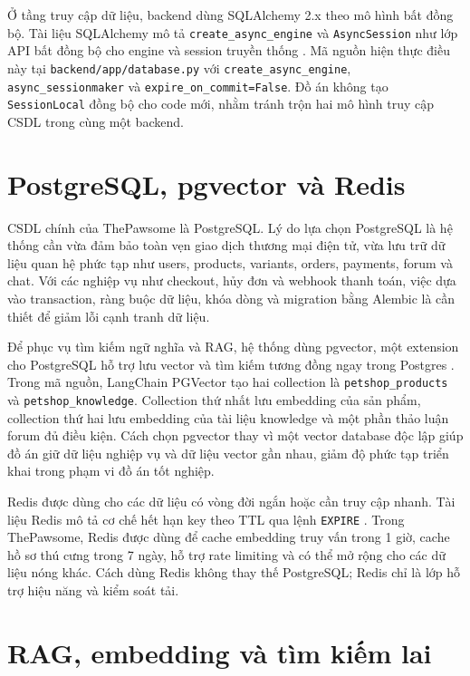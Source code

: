 \documentclass[../DoAn.tex]{subfiles}
\begin{document}
Ở tầng truy cập dữ liệu, backend dùng SQLAlchemy 2.x theo mô hình bất đồng bộ. Tài liệu SQLAlchemy mô tả \texttt{create\_async\_engine} và \texttt{AsyncSession} như lớp API bất đồng bộ cho engine và session truyền thống \cite{sqlalchemyAsyncioDocs}. Mã nguồn hiện thực điều này tại \texttt{backend/app/database.py} với \texttt{create\_async\_engine}, \texttt{async\_sessionmaker} và \texttt{expire\_on\_commit=False}. Đồ án không tạo \texttt{SessionLocal} đồng bộ cho code mới, nhằm tránh trộn hai mô hình truy cập CSDL trong cùng một backend.

\section{PostgreSQL, pgvector và Redis}
\label{section:3.2}

CSDL chính của ThePawsome là PostgreSQL. Lý do lựa chọn PostgreSQL là hệ thống cần vừa đảm bảo toàn vẹn giao dịch thương mại điện tử, vừa lưu trữ dữ liệu quan hệ phức tạp như users, products, variants, orders, payments, forum và chat. Với các nghiệp vụ như checkout, hủy đơn và webhook thanh toán, việc dựa vào transaction, ràng buộc dữ liệu, khóa dòng và migration bằng Alembic là cần thiết để giảm lỗi cạnh tranh dữ liệu.

Để phục vụ tìm kiếm ngữ nghĩa và RAG, hệ thống dùng pgvector, một extension cho PostgreSQL hỗ trợ lưu vector và tìm kiếm tương đồng ngay trong Postgres \cite{pgvectorDocs}. Trong mã nguồn, LangChain PGVector tạo hai collection là \texttt{petshop\_products} và \texttt{petshop\_knowledge}. Collection thứ nhất lưu embedding của sản phẩm, collection thứ hai lưu embedding của tài liệu knowledge và một phần thảo luận forum đủ điều kiện. Cách chọn pgvector thay vì một vector database độc lập giúp đồ án giữ dữ liệu nghiệp vụ và dữ liệu vector gần nhau, giảm độ phức tạp triển khai trong phạm vi đồ án tốt nghiệp.

Redis được dùng cho các dữ liệu có vòng đời ngắn hoặc cần truy cập nhanh. Tài liệu Redis mô tả cơ chế hết hạn key theo TTL qua lệnh \texttt{EXPIRE} \cite{redisExpireDocs}. Trong ThePawsome, Redis được dùng để cache embedding truy vấn trong 1 giờ, cache hồ sơ thú cưng trong 7 ngày, hỗ trợ rate limiting và có thể mở rộng cho các dữ liệu nóng khác. Cách dùng Redis không thay thế PostgreSQL; Redis chỉ là lớp hỗ trợ hiệu năng và kiểm soát tải.

\section{RAG, embedding và tìm kiếm lai}
\label{section:3.3}
\end{document}
